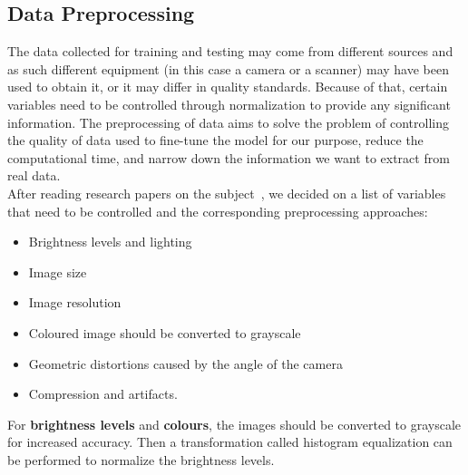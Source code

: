 \documentclass[twoside,a4paper]{article}
\begin{document}
\subsection{Data Preprocessing}

The data collected for training and testing may come from different sources and as such different equipment (in this case a camera or a scanner) may have been used to obtain it, or it may differ in quality standards. Because of that, certain variables need to be controlled through normalization to provide any significant information. The preprocessing of data aims to solve the problem of controlling the quality of data used to fine-tune the model for our purpose, reduce the computational time, and narrow down the information we want to extract from real data.\\
After reading research papers on the subject~\cite{Tensmeyer2015}, we decided on a list of variables that need to be controlled and the corresponding preprocessing approaches:
\begin{itemize}
    \item Brightness levels and lighting
    \item Image size
    \item Image resolution
    \item Coloured image should be converted to grayscale
    \item Geometric distortions caused by the angle of the camera
    \item Compression and artifacts.
\end{itemize}
For \textbf{brightness levels} and \textbf{colours}, the images should be converted to grayscale for increased accuracy. Then a transformation called histogram equalization can be performed to normalize the brightness levels.\\
\end{document}
